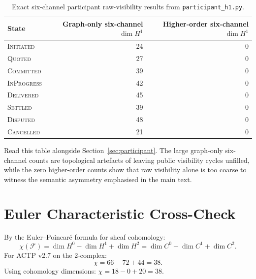 \documentclass[11pt]{article}
\theoremstyle{plain}
\theoremstyle{definition}
\newcommand{\Fsh}{\mathcal{F}}         %
\newcommand{\Czero}{C^{0}}
\newcommand{\Cone}{C^{1}}
\newcommand{\Ctwo}{C^{2}}
\newcommand{\Hzero}{H^{0}}
\newcommand{\Hone}{H^{1}}
\newcommand{\Htwo}{H^{2}}
\newcommand{\dimn}{\operatorname{dim}}
\newcommand{\sINIT}{\textsc{Initiated}}
\newcommand{\sQUOT}{\textsc{Quoted}}
\newcommand{\sCOMM}{\textsc{Committed}}
\newcommand{\sINPROG}{\textsc{InProgress}}
\newcommand{\sDELIV}{\textsc{Delivered}}
\newcommand{\sSETTL}{\textsc{Settled}}
\newcommand{\sDISP}{\textsc{Disputed}}
\newcommand{\sCANC}{\textsc{Cancelled}}
\begin{document}
\begin{table}[h]
\centering
\caption{Exact six-channel participant raw-visibility results from \texttt{participant\_h1.py}.}
\label{tab:participant_higher}
\begin{tabular}{@{}lrr@{}}
\toprule
\textbf{State} & Graph-only six-channel $\dimn\Hone$ & Higher-order six-channel $\dimn\Hone$ \\
\midrule
\sINIT   & 24 & 0 \\
\sQUOT   & 27 & 0 \\
\sCOMM   & 39 & 0 \\
\sINPROG & 42 & 0 \\
\sDELIV  & 45 & 0 \\
\sSETTL  & 39 & 0 \\
\sDISP   & 48 & 0 \\
\sCANC   & 21 & 0 \\
\bottomrule
\end{tabular}
\end{table}

\noindent
Read this table alongside Section~\ref{sec:participant}.  The large
graph-only six-channel counts are topological artefacts of leaving public
visibility cycles unfilled, while the zero higher-order counts show that
raw visibility alone is too coarse to witness the semantic asymmetry
emphasised in the main text.

\section{Euler Characteristic Cross-Check}
\label{app:euler}

By the Euler--Poincaré formula for sheaf cohomology:
\[
  \chi(\Fsh) = \dimn\Hzero - \dimn\Hone + \dimn\Htwo
             = \dimn\Czero - \dimn\Cone + \dimn\Ctwo.
\]
For ACTP v2.7 on the 2-complex:
\[
  \chi = 66 - 72 + 44 = 38.
\]
Using cohomology dimensions: $\chi = 18 - 0 + 20 = 38$. \checkmark
\end{document}
